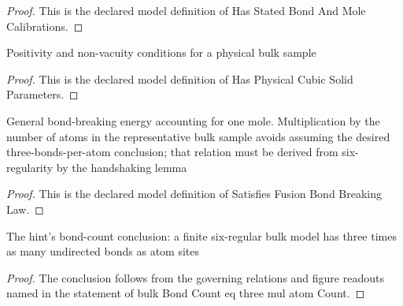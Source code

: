 \begin{proof}
  This is the declared model definition of Has Stated Bond And Mole Calibrations.
\end{proof}
\begin{definition}
  \label{def:physics:phyx-mini-0625:phyxminiproblems-problemphyxmini0625-hasphysicalcubicsolidparameters}
  Positivity and non-vacuity conditions for a physical bulk sample
\end{definition}
\begin{proof}
  This is the declared model definition of Has Physical Cubic Solid Parameters.
\end{proof}
\begin{definition}
  \label{def:physics:phyx-mini-0625:phyxminiproblems-problemphyxmini0625-satisfiesfusionbondbreakinglaw}
  General bond-breaking energy accounting for one mole. Multiplication by the number of atoms in the representative bulk sample avoids assuming the desired three-bonds-per-atom conclusion; that relation must be derived from six-regularity by the handshaking lemma
\end{definition}
\begin{proof}
  This is the declared model definition of Satisfies Fusion Bond Breaking Law.
\end{proof}
\begin{lemma}
  \label{lem:physics:phyx-mini-0625:phyxminiproblems-problemphyxmini0625-bulkbondcount-eq-three-mul-atomcount}
  The hint's bond-count conclusion: a finite six-regular bulk model has three times as many undirected bonds as atom sites
\end{lemma}
\begin{proof}
  The conclusion follows from the governing relations and figure readouts named in the statement of bulk Bond Count eq three mul atom Count.
\end{proof}
